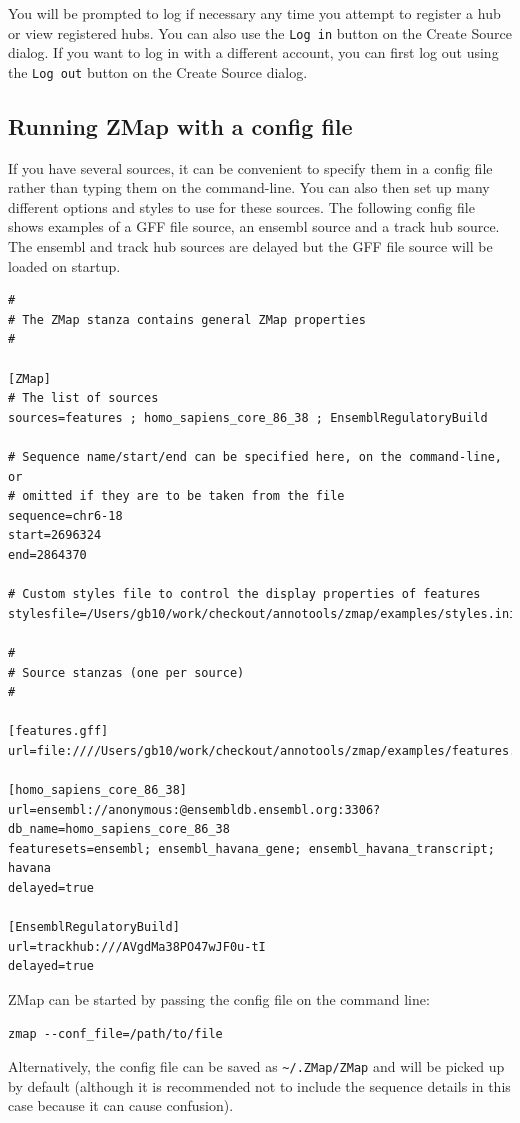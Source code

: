 \documentclass[letterpaper]{article}
\begin{document}
You will be prompted to log if necessary any time you attempt to register a hub or view registered hubs. You can also use the \lstinline{Log in} button on the Create Source dialog. If you want to log in with a different account, you can first log out using the \lstinline{Log out} button on the Create Source dialog.


\subsection{Running ZMap with a config file}
If you have several sources, it can be convenient to specify them in a config file rather than typing them on the command-line. You can also then set up many different options and styles to use for these sources. The following config file shows examples of a GFF file source, an ensembl source and a track hub source. The ensembl and track hub sources are delayed but the GFF file source will be loaded on startup.

\begin{lstlisting}
#
# The ZMap stanza contains general ZMap properties
#

[ZMap]
# The list of sources
sources=features ; homo_sapiens_core_86_38 ; EnsemblRegulatoryBuild

# Sequence name/start/end can be specified here, on the command-line, or
# omitted if they are to be taken from the file
sequence=chr6-18
start=2696324
end=2864370

# Custom styles file to control the display properties of features
stylesfile=/Users/gb10/work/checkout/annotools/zmap/examples/styles.ini

#
# Source stanzas (one per source)
#

[features.gff]
url=file:////Users/gb10/work/checkout/annotools/zmap/examples/features.gff

[homo_sapiens_core_86_38]
url=ensembl://anonymous:@ensembldb.ensembl.org:3306?db_name=homo_sapiens_core_86_38
featuresets=ensembl; ensembl_havana_gene; ensembl_havana_transcript; havana
delayed=true

[EnsemblRegulatoryBuild]
url=trackhub:///AVgdMa38PO47wJF0u-tI
delayed=true
\end{lstlisting}

ZMap can be started by passing the config file on the command line:
\begin{lstlisting}
zmap --conf_file=/path/to/file
\end{lstlisting}

Alternatively, the config file can be saved as \lstinline{~/.ZMap/ZMap} and will be picked up by default (although it is recommended not to include the sequence details in this case because it can cause confusion).
\end{document}
